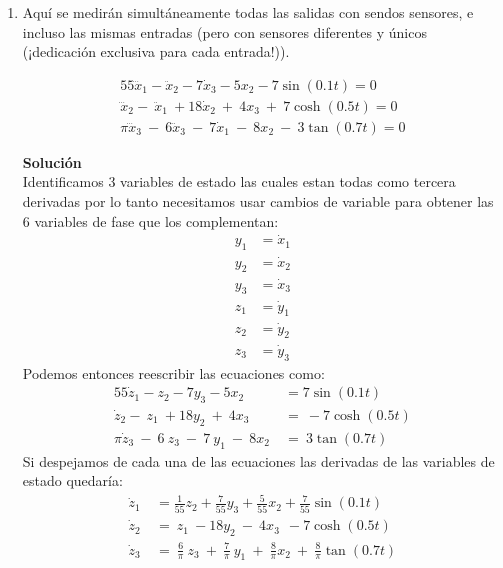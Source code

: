 \documentclass[letterpaper, 12pt]{article}
\begin{document}
\begin{enumerate}
\begin{enumerate}








\item Aquí se medirán simultáneamente todas las salidas con sendos sensores, e incluso las mismas entradas (pero con sensores diferentes y únicos (¡dedicación exclusiva para cada entrada!)).

\begin{equation}
\begin{split}
    55\dddot{x}_1-\ddot{x}_2-7\dot{x}_3-5x_2-7\sin(0.1t)=0 \\
    {\dddot{x}}_2-\ {\ddot{x}}_1\ +18{\dot{x}}_2\ +\ 4x_3\ +\ 7\cosh(0.5t)=0 \\
    \pi\dddot{x}_3\ -\ 6\ddot{x}_3\ -\ 7\dot{x}_1\ -\ 8x_2\ -\ 3\tan(0.7t) =0 
\end{split}
\end{equation}

\textbf{Solución} \\
Identificamos 3 variables de estado las cuales estan todas como tercera derivadas por lo tanto necesitamos usar cambios de variable para obtener las 6 variables de fase que los complementan:
\begin{equation}
\begin{split}
    y_1 &= \dot{x}_1 \\
    y_2 &= \dot{x}_2 \\
    y_3 &= \dot{x}_3 \\
    z_1 &= \dot{y}_1 \\
    z_2 &= \dot{y}_2 \\
    z_3 &= \dot{y}_3 \label{2.b.CambioV}
\end{split} 
\end{equation}
Podemos entonces reescribir las ecuaciones como:
\begin{align*}
    55\dot{z}_1-z_2-7y_3-5x_2 &= 7\sin(0.1t) \\
    {\dot{z}}_2-\ z_1\ +18y_2\ +\ 4x_3\ &=\ -7 \cosh(0.5t) \\
    \pi\dot{z}_3\ -\ 6\ z_3\ -\ 7\ y_1\ -\ 8x_2\ &=\ 3\tan(0.7t) \   
\end{align*}
Si despejamos de cada una de las ecuaciones las derivadas de las variables de estado quedaría:
 \begin{equation}
 \begin{split}
    \dot{z}_1&=\frac{1}{55}z_2+\frac{7}{55}y_3+\frac{5}{55}x_2+\frac{7}{55}\sin(0.1t) \\
    {\dot{z}}_2&=\ z_1\ -18y_2\ -\ 4x_3\ \ -7\cosh(0.5t)  \\
    \dot{z}_3\ &=\ \frac{6}{\pi}\ z_3\ +\ \frac{7}{\pi}\ y_1\ +\ \frac{8}{\pi}x_2\ +\ \frac{8}{\pi}\tan(0.7t)
    \label{1.b.mainV}
\end{split}
\end{equation}


\end{enumerate}
\end{enumerate}
\end{document}
